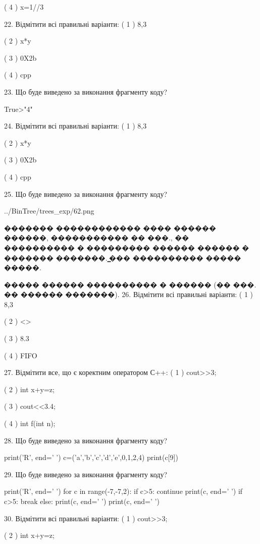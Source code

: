 \documentclass[11pt]{article}
\begin{document}
( 4 ) x=1//3

22. Відмітити всі правильні варіанти:
( 1 ) 8,3

( 2 ) x*y

( 3 ) 0X2b

( 4 ) cpp

23. Що буде виведено за виконання фрагменту коду?

True>"4"

24. Відмітити всі правильні варіанти:
( 1 ) 8,3

( 2 ) x*y

( 3 ) 0X2b

( 4 ) cpp

25. Що буде виведено за виконання фрагменту коду?

\begin{center}
	{../BinTree/trees_exp/62.png}
\end{center}
������� ������������ ���� ������ ������, ����������� �� ���., �� ���������� � ��������� ������ ������ � ������� �������. ̳��� ���������� ����� �����.\par ����� ������ ���������� � ������ (�� ���. �� ������ �������).
26. Відмітити всі правильні варіанти:
( 1 ) 8,3

( 2 ) <>

( 3 ) 8.3

( 4 ) FIFO

27. Відмітити все, що є коректним оператором С++:
( 1 ) cout>>3;

( 2 ) int x+y=z;

( 3 ) cout<<3.4;

( 4 ) int f(int n);

28. Що буде виведено за виконання фрагменту коду?

print('R', end=' ')
c=('a','b','c','d','e',0,1,2,4)
print(c[9])


29. Що буде виведено за виконання фрагменту коду?

print('R', end=' ')
for c in range(-7,-7,2):
    if c>5:
        continue
        print(c, end=' ')
    if c>5:
        break
    else:
        print(c, end=' ')
    print(c, end=' ')

30. Відмітити всі правильні варіанти:
( 1 ) cout>>3;

( 2 ) int x+y=z;
\end{document}
